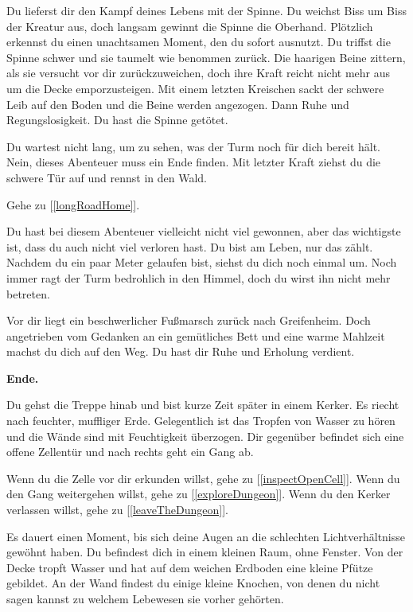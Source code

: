 Du lieferst dir den Kampf deines Lebens mit der Spinne. Du weichst Biss um Biss der Kreatur aus, doch langsam gewinnt die Spinne die Oberhand. Plötzlich erkennst du einen unachtsamen Moment, den du sofort ausnutzt. Du triffst die Spinne schwer und sie taumelt wie benommen zurück. Die haarigen Beine zittern, als sie versucht vor dir zurückzuweichen, doch ihre Kraft reicht nicht mehr aus um die Decke emporzusteigen. Mit einem letzten Kreischen sackt der schwere Leib auf den Boden und die Beine werden angezogen. Dann Ruhe und Regungslosigkeit. Du hast die Spinne getötet.

Du wartest nicht lang, um zu sehen, was der Turm noch für dich bereit hält. Nein, dieses Abenteuer muss ein Ende finden. Mit letzter Kraft ziehst du die schwere Tür auf und rennst in den Wald.

Gehe zu [\ref{longRoadHome}].


Du hast bei diesem Abenteuer vielleicht nicht viel gewonnen, aber das wichtigste ist, dass du auch nicht viel verloren hast. Du bist am Leben, nur das zählt. Nachdem du ein paar Meter gelaufen bist, siehst du dich noch einmal um. Noch immer ragt der Turm bedrohlich in den Himmel, doch du wirst ihn nicht mehr betreten.

Vor dir liegt ein beschwerlicher Fußmarsch zurück nach Greifenheim. Doch angetrieben vom Gedanken an ein gemütliches Bett und eine warme Mahlzeit machst du dich auf den Weg. Du hast dir Ruhe und Erholung verdient.

\textbf{Ende.}


Du gehst die Treppe hinab und bist kurze Zeit später in einem Kerker. Es riecht nach feuchter, muffliger Erde. Gelegentlich ist das Tropfen von Wasser zu hören und die Wände sind mit Feuchtigkeit überzogen. Dir gegenüber befindet sich eine offene Zellentür und nach rechts geht ein Gang ab.

Wenn du die Zelle vor dir erkunden willst, gehe zu [\ref{inspectOpenCell}].
Wenn du den Gang weitergehen willst, gehe zu [\ref{exploreDungeon}].
Wenn du den Kerker verlassen willst, gehe zu [\ref{leaveTheDungeon}].


Es dauert einen Moment, bis sich deine Augen an die schlechten Lichtverhältnisse gewöhnt haben. Du befindest dich in einem kleinen Raum, ohne Fenster. Von der Decke tropft Wasser und hat auf dem weichen Erdboden eine kleine Pfütze gebildet. An der Wand findest du einige kleine Knochen, von denen du nicht sagen kannst zu welchem Lebewesen sie vorher gehörten.

